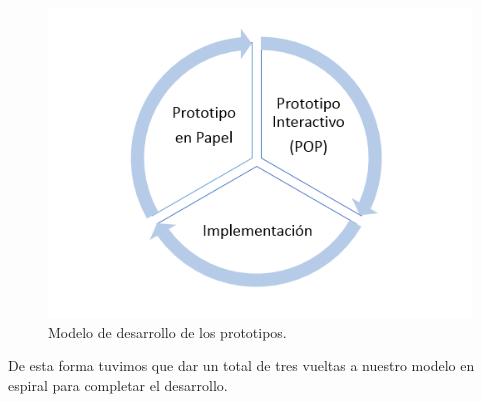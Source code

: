   \begin{figure}[h]
   \centering
	\includegraphics[keepaspectratio, scale=1]{Media/Captures/prototypesDiagram.png}
    \caption{Modelo de desarrollo de los prototipos.}
   \label{fig:sequenceDiagram_waveWebSocket}
  \end{figure}
  
De esta forma tuvimos que dar un total de tres vueltas a nuestro modelo en espiral para completar el desarrollo.

